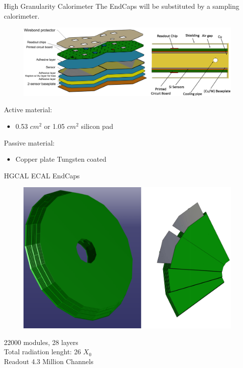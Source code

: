 \documentclass{beamer}
\begin{document}
\begin{frame}{High Granularity Calorimeter}
The EndCaps will be substituted by a sampling calorimeter.
\begin{figure}
\begin{center}
\includegraphics[scale=2.0]{images/hgcalMod.png}
\end{center}
\end{figure}
Active material:
\begin{itemize}
\item 0.53 $cm^2$ or 1.05 $cm^2$ silicon pad
\end{itemize}
Passive material:
\begin{itemize}
\item Copper plate Tungsten coated
\end{itemize}

\end{frame}

\begin{frame}{HGCAL ECAL EndCaps}
\begin{figure}
\begin{center}
\includegraphics[scale=1.8]{images/hgcalStruct.png}
\end{center}
\end{figure}
\begin{center}
22000 modules, 28 layers\\
Total radiation lenght: 26 $X_0$\\
\vspace{0.5cm}
Readout 4.3 Million Channels
\end{center}
\end{frame}
\end{document}
